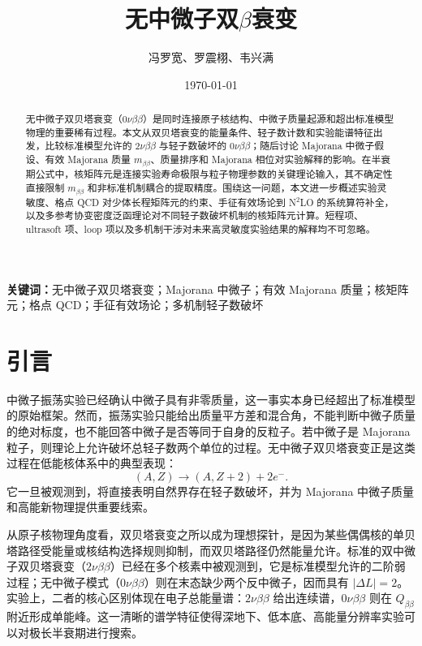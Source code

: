 \documentclass[12pt,a4paper]{ctexart}
\title{无中微子双\texorpdfstring{$\beta$}{beta}衰变}
\author{冯罗宽、罗震栩、韦兴满}
\date{\today}
\begin{document}
\maketitle

\begin{abstract}
无中微子双贝塔衰变（$0\nu\beta\beta$）是同时连接原子核结构、中微子质量起源和超出标准模型物理的重要稀有过程。本文从双贝塔衰变的能量条件、轻子数计数和实验能谱特征出发，比较标准模型允许的 $2\nu\beta\beta$ 与轻子数破坏的 $0\nu\beta\beta$；随后讨论 Majorana 中微子假设、有效 Majorana 质量 $m_{\beta\beta}$、质量排序和 Majorana 相位对实验解释的影响。在半衰期公式中，核矩阵元是连接实验寿命极限与粒子物理参数的关键理论输入，其不确定性直接限制 $m_{\beta\beta}$ 和非标准机制耦合的提取精度。围绕这一问题，本文进一步概述实验灵敏度、格点 QCD 对少体长程矩阵元的约束、手征有效场论到 N$^2$LO 的系统算符补全，以及多参考协变密度泛函理论对不同轻子数破坏机制的核矩阵元计算。短程项、ultrasoft 项、loop 项以及多机制干涉对未来高灵敏度实验结果的解释均不可忽略。
\end{abstract}

\noindent\textbf{关键词：}无中微子双贝塔衰变；Majorana 中微子；有效 Majorana 质量；核矩阵元；格点 QCD；手征有效场论；多机制轻子数破坏

\newpage
\tableofcontents

\newpage
\onehalfspacing

\section{引言}

中微子振荡实验已经确认中微子具有非零质量，这一事实本身已经超出了标准模型的原始框架。然而，振荡实验只能给出质量平方差和混合角，不能判断中微子质量的绝对标度，也不能回答中微子是否等同于自身的反粒子。若中微子是 Majorana 粒子，则理论上允许破坏总轻子数两个单位的过程。无中微子双贝塔衰变正是这类过程在低能核体系中的典型表现：
\[
	(A,Z)\rightarrow(A,Z+2)+2e^- .
\]
它一旦被观测到，将直接表明自然界存在轻子数破坏，并为 Majorana 中微子质量和高能新物理提供重要线索。

从原子核物理角度看，双贝塔衰变之所以成为理想探针，是因为某些偶偶核的单贝塔路径受能量或核结构选择规则抑制，而双贝塔路径仍然能量允许。标准的双中微子双贝塔衰变（$2\nu\beta\beta$）已经在多个核素中被观测到，它是标准模型允许的二阶弱过程；无中微子模式（$0\nu\beta\beta$）则在末态缺少两个反中微子，因而具有 $|\Delta L|=2$。实验上，二者的核心区别体现在电子总能量谱：$2\nu\beta\beta$ 给出连续谱，$0\nu\beta\beta$ 则在 $Q_{\beta\beta}$ 附近形成单能峰。这一清晰的谱学特征使得深地下、低本底、高能量分辨率实验可以对极长半衰期进行搜索。
\end{document}
